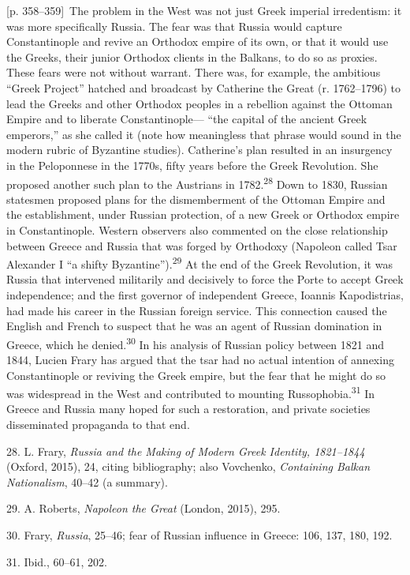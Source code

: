 \documentclass[10pt,a4paper]{article}
\begin{document}
{\scriptsize\color{gray}[p. 358–359]}\ The problem in the West was not just Greek imperial irredentism: it was more specifically Russia. The fear was that Russia would capture Constantinople and revive an Orthodox empire of its own, or that it would use the Greeks, their junior Orthodox clients in the Balkans, to do so as proxies. These fears were not without warrant. There was, for example, the ambitious “Greek Project” hatched and broadcast by Catherine the Great (r. 1762–1796) to lead the Greeks and other Orthodox peoples in a rebellion against the Ottoman Empire and to liberate Constantinople— “the capital of the ancient Greek emperors,” as she called it (note how meaningless that phrase would sound in the modern rubric of Byzantine studies). Catherine’s plan resulted in an insurgency in the Peloponnese in the 1770s, fifty years before the Greek Revolution. She proposed another such plan to the Austrians in 1782.\nobreak\textsuperscript{28} Down to 1830, Russian statesmen proposed plans for the dismemberment of the Ottoman Empire and the establishment, under Russian protection, of a new Greek or Orthodox empire in Constantinople. Western observers also commented on the close relationship between Greece and Russia that was forged by Orthodoxy (Napoleon called Tsar Alexander I “a shifty Byzantine”).\nobreak\textsuperscript{29} At the end of the Greek Revolution, it was Russia that intervened militarily and decisively to force the Porte to accept Greek independence; and the first governor of independent Greece, Ioannis Kapodistrias, had made his career in the Russian foreign service. This connection caused the English and French to suspect that he was an agent of Russian domination in Greece, which he denied.\nobreak\textsuperscript{30} In his analysis of Russian policy between 1821 and 1844, Lucien Frary has argued that the tsar had no actual intention of annexing Constantinople or reviving the Greek empire, but the fear that he might do so was widespread in the West and contributed to mounting Russophobia.\nobreak\textsuperscript{31} In Greece and Russia many hoped for such a restoration, and private societies disseminated propaganda to that end.\par{\small 28. L. Frary, \textit{Russia and the Making of Modern Greek Identity, 1821–1844} (Oxford, 2015), 24, citing bibliography; also Vovchenko, \textit{Containing Balkan Nationalism}, 40–42 (a summary).\par}{\small 29. A. Roberts, \textit{Napoleon the Great} (London, 2015), 295.\par}{\small 30. Frary, \textit{Russia}, 25–46; fear of Russian influence in Greece: 106, 137, 180, 192.\par}{\small 31.  Ibid., 60–61, 202.\par}
\end{document}
